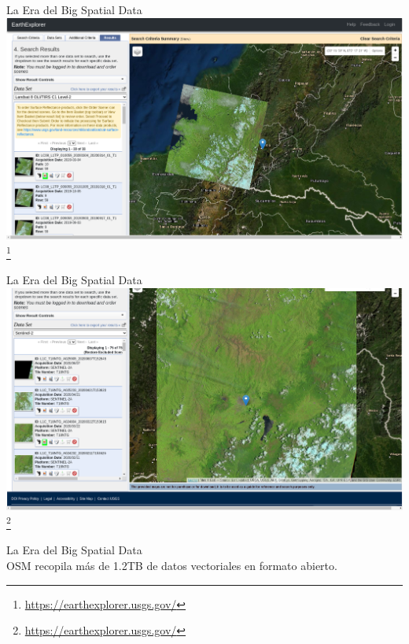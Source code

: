 \documentclass{beamer}
\newcommand\blfootnote[1]{%
  \begingroup
  \renewcommand\thefootnote{}\footnote{#1}%
  \addtocounter{footnote}{-1}%
  \endgroup
}
\begin{document}
\begin{frame}{La Era del Big Spatial Data}
  \centering
  \includegraphics[width=\textwidth]{figures/ee}
  \blfootnote{\url{https://earthexplorer.usgs.gov/}}
\end{frame}

\begin{frame}{La Era del Big Spatial Data}
  \centering
  \includegraphics[width=\textwidth]{figures/sentinel}
  \blfootnote{\url{https://earthexplorer.usgs.gov/}}
\end{frame}

\begin{frame}{La Era del Big Spatial Data}
    \centering
    \\
    
    OSM recopila más de 1.2TB de datos vectoriales en formato abierto.
\end{frame}
\end{document}
